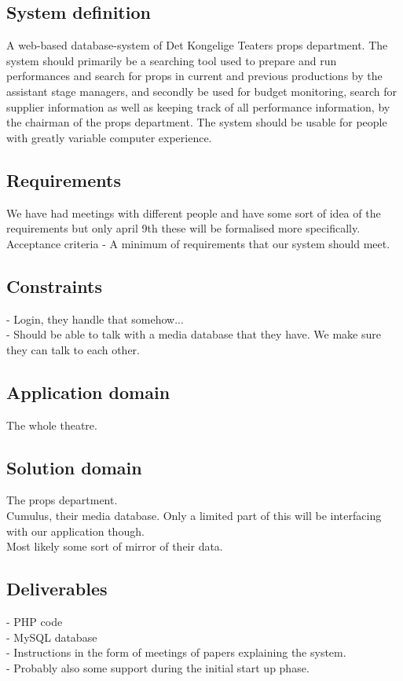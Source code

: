 \documentclass[12pt]{article}
\begin{document}
\subsection{System definition}
A web-based database-system of Det Kongelige Teaters props department. The system should primarily be a searching tool used to prepare and run performances and search for props in current and previous productions by the assistant stage managers, and secondly be used for budget monitoring, search for supplier information as well as keeping track of all performance information, by the chairman of the props department. The system should be usable for people with greatly variable computer experience.
\subsection{Requirements}
We have had meetings with different people and have some sort of idea of the requirements but only april 9th these will be formalised more specifically. \\
Acceptance criteria - A minimum of requirements that our system should meet.
\subsection{Constraints}
- Login, they handle that somehow...\\
- Should be able to talk with a media database that they have. We make sure they can talk to each other.
\subsection{Application domain}
The whole theatre.
\subsection{Solution domain}
The props department. \\
Cumulus, their media database. Only a limited part of this will be interfacing with our application though. \\
Most likely some sort of mirror of their data. 
\subsection{Deliverables}
- PHP code \\
- MySQL database \\
- Instructions in the form of meetings of papers explaining the system.\\
- Probably also some support during the initial start up phase.
\end{document}
